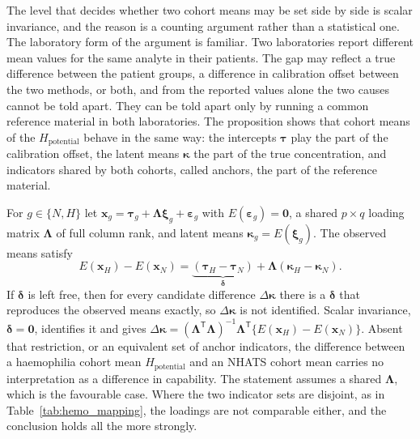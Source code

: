 The level that decides whether two cohort means may be set side by side is
scalar invariance, and the reason is a counting argument rather than a
statistical one. The laboratory form of the argument is familiar. Two
laboratories report different mean values for the same analyte in their
patients. The gap may reflect a true difference between the patient groups, a
difference in calibration offset between the two methods, or both, and from the
reported values alone the two causes cannot be told apart. They can be told
apart only by running a common reference material in both laboratories. The
proposition shows that cohort means of the $H_{\text{potential}}$ behave in the
same way: the intercepts $\boldsymbol\tau$ play the part of the calibration
offset, the latent means $\boldsymbol\kappa$ the part of the true concentration,
and indicators shared by both cohorts, called anchors, the part of the
reference material.

\begin{proposition}
\label{prop:hem:scalar}
For $g\in\{N,H\}$ let $\mathbf x_g=\boldsymbol\tau_g+\boldsymbol\Lambda
\boldsymbol\xi_g+\boldsymbol\varepsilon_g$ with $E(\boldsymbol\varepsilon_g)=
\mathbf 0$, a shared $p\times q$ loading matrix $\boldsymbol\Lambda$ of full
column rank, and latent means $\boldsymbol\kappa_g=E(\boldsymbol\xi_g)$. The
observed means satisfy
\[
  E(\mathbf x_H)-E(\mathbf x_N)
  =\underbrace{(\boldsymbol\tau_H-\boldsymbol\tau_N)}_{\boldsymbol\delta}
   +\boldsymbol\Lambda(\boldsymbol\kappa_H-\boldsymbol\kappa_N).
\]
If $\boldsymbol\delta$ is left free, then for every candidate difference
$\Delta\boldsymbol\kappa$ there is a $\boldsymbol\delta$ that reproduces the
observed means exactly, so $\Delta\boldsymbol\kappa$ is not identified. Scalar
invariance, $\boldsymbol\delta=\mathbf 0$, identifies it and gives
$\Delta\boldsymbol\kappa=(\boldsymbol\Lambda^{\mathsf T}\boldsymbol\Lambda)^{-1}
\boldsymbol\Lambda^{\mathsf T}\{E(\mathbf x_H)-E(\mathbf x_N)\}$. Absent that
restriction, or an equivalent set of anchor indicators, the difference between
a haemophilia cohort mean $H_{\text{potential}}$ and an NHATS cohort mean
carries no interpretation as a difference in capability. The statement assumes
a shared $\boldsymbol\Lambda$, which is the favourable case. Where the two
indicator sets are disjoint, as in Table~\ref{tab:hemo_mapping}, the loadings
are not comparable either, and the conclusion holds all the more strongly.
\end{proposition}


